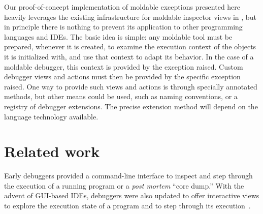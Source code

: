 \documentclass[sigplan,anonymous,review,10pt]{acmart}
\newcommand\on[1]{\nbc{ON}{#1}{olive}} %
\newcommand\ac[1]{\nbc{AC}{#1}{teal}}
\newcommand{\GT}{\lst{GT}\xspace} %
\begin{document}
Our proof-of-concept implementation of moldable exceptions presented here heavily leverages the existing infrastructure for moldable inspector views in \GT, but in principle there is nothing to prevent its application to other programming languages and IDEs.
The basic idea is simple: any moldable tool must be prepared, whenever it is created, to examine the execution context of the objects it is initialized with, and use that context to adapt its behavior.
In the case of a moldable debugger, this context is provided by the exception raised.
Custom debugger views and actions must then be provided by the specific exception raised.
One way to provide such views and actions is through specially annotated methods, but other means could be used, such as naming conventions, or a registry of debugger extensions.
The precise extension method will depend on the language technology available.


\section{Related work}\label{sec:related}

Early debuggers provided a command-line interface to inspect and step through the execution of a running program or a \emph{post mortem} ``core dump.''
With the advent of GUI-based IDEs, debuggers were also updated to offer interactive views to explore the execution state of a program and to step through its execution~\cite{Rose96a}.
\end{document}
